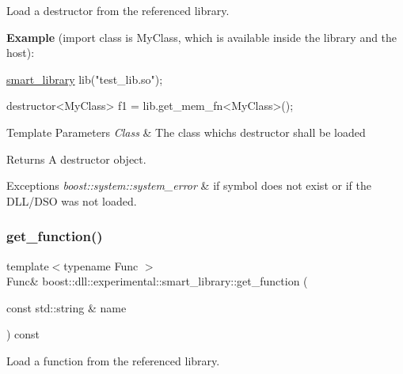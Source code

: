 Load a destructor from the referenced library.

{\bfseries Example} (import class is My\+Class, which is available inside the library and the host)\+:


\begin{DoxyCode}
\hyperlink{a01712_af1fa4c4ed871e889f92f4c11d574d91f}{smart\_library} lib(\textcolor{stringliteral}{"test\_lib.so"});

destructor<MyClass>     f1 = lib.get\_mem\_fn<MyClass>();
\end{DoxyCode}



\begin{DoxyTemplParams}{Template Parameters}
{\em Class} & The class whichs destructor shall be loaded \\
\hline
\end{DoxyTemplParams}
\begin{DoxyReturn}{Returns}
A destructor object.
\end{DoxyReturn}

\begin{DoxyExceptions}{Exceptions}
{\em boost\+::system\+::system\+\_\+error} & if symbol does not exist or if the D\+L\+L/\+D\+SO was not loaded. \\
\hline
\end{DoxyExceptions}
\mbox{\label{a01712_aef5f4ef013d80744b97fd2cceee7b080}} 
\subsubsection{\texorpdfstring{get\+\_\+function()}{get\_function()}}
{\footnotesize\ttfamily template$<$typename Func $>$ \\
Func\& boost\+::dll\+::experimental\+::smart\+\_\+library\+::get\+\_\+function (\begin{DoxyParamCaption}\item[{const std\+::string \&}]{name }\end{DoxyParamCaption}) const\hspace{0.3cm}{\ttfamily [inline]}}

Load a function from the referenced library.

